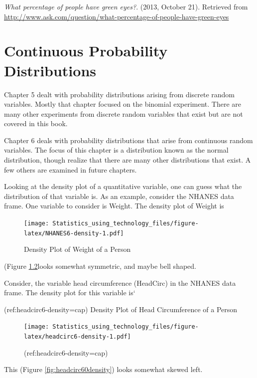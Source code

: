 \documentclass[]{book}
\begin{document}
\emph{What percentage of people have green eyes?}. (2013, October 21).
Retrieved from
\url{http://www.ask.com/question/what-percentage-of-people-have-green-eyes}

\hypertarget{continuous-probability-distributions}{%
\chapter{Continuous Probability Distributions}\label{continuous-probability-distributions}}

Chapter 5 dealt with probability distributions arising from discrete random variables. Mostly that chapter focused on the binomial experiment. There are many other experiments from discrete random variables that exist but are not covered in this book.

Chapter 6 deals with probability distributions that arise from continuous random variables. The focus of this chapter is a distribution known as the normal distribution, though realize that there are many other distributions that exist. A few others are examined in future chapters.

Looking at the density plot of a quantitative variable, one can guess what the distribution of that variable is. As an example, consider the NHANES data frame. One variable to consider is Weight. The density plot of Weight is



\begin{figure}
\centering
\texttt{[image: Statistics\_using\_technology\_files/figure-latex/NHANES6-density-1.pdf]}
\caption{\label{fig:NHANES6-density}Density Plot of Weight of a Person}
\end{figure}

(Figure \ref{fig:headcirc6-density}looks somewhat symmetric, and maybe bell shaped.

Consider, the variable head circumference (HeadCirc) in the NHANES data frame. The density plot for this variable is`

(ref:headcirc6-density=cap) Density Plot of Head Circumference of a Person

\begin{figure}
\centering
\texttt{[image: Statistics\_using\_technology\_files/figure-latex/headcirc6-density-1.pdf]}
\caption{\label{fig:headcirc6-density}(ref:headcirc6-density=cap)}
\end{figure}

This (Figure \ref{fig:headcirc60density}) looks somewhat skewed left.
\end{document}
